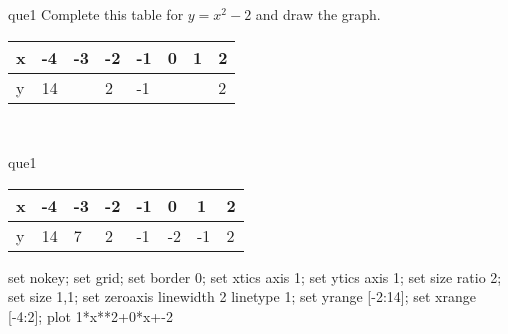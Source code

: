 \documentclass[13.5pt, varwidth=true]{beamer}
\begin{document}
\begin{frame}[shrink=19,fragile]
	\begin{beamercolorbox}[rounded=true, left, shadow=true,wd=14.8cm]{que1}
		 Complete this table for $y = x^{2} - 2$ and draw the graph. \\[0.3cm] \renewcommand{\arraystretch}{1.2}\begin{tabular}{|C|C|C|C|C|C|C|C|} \hline x & -4 & -3 & -2 & -1 & 0 & 1 & 2 \\ \hline y & 14 &  & 2 & -1 &  &  & 2\\ \hline \end{tabular}\\[0.3cm]
	\end{beamercolorbox}
\end{frame}
\begin{frame}[shrink=19,fragile]
	\begin{beamercolorbox}[rounded=true, left, shadow=true,wd=14.8cm]{que1}
		\renewcommand{\arraystretch}{1.2}\begin{tabular}{|C|C|C|C|C|C|C|C|} \hline x & -4 & -3 & -2 & -1 & 0 & 1 & 2 \\ \hline y & 14 & 7 & 2 & -1 & -2 & -1 & 2\\ \hline \end{tabular}\begin{gnuplot}[terminal=pdf] set nokey; set grid; set border 0; set xtics axis 1; set ytics axis 1; set size ratio 2; set size 1,1; set zeroaxis linewidth 2 linetype 1; set yrange [-2:14]; set xrange [-4:2]; plot 1*x**2+0*x+-2 \end{gnuplot}
	\end{beamercolorbox}
\end{frame}
\end{document}
